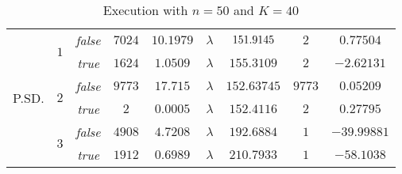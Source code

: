 \documentclass[notitlepage]{article}
\newcommand{\highlight}[1]{{\cellcolor{yellow!30} #1}}
\begin{document}
\begin{table}[H]
{\begin{tabular}{| c | c | c | c | c | c | c | c | c |}
    \multirow{6}{*}{P.SD.} & \multirow{2}{*}{$1$} & {\itshape false} & $7024$ & $10.1979$ & $\lambda$ & $\highlight{151.9145}$ & $2$ & $0.77504$ \\
    \cline{3-9}
     & & {\itshape true} & $1624$ & $1.0509$ & $\lambda$ & $155.3109$ & $2$ & $-2.62131$ \\
    \cline{2-9}
    & \multirow{2}{*}{$2$} & {\itshape false} & $9773$ & $17.715$ & $\lambda$ & $152.63745$ & $9773$ & $0.05209$ \\ 
    \cline{3-9}
     & & {\itshape true} & $2$ & $0.0005$ & $\lambda$ & $152.4116$ & $2$ & $0.27795$ \\ 
    \cline{2-9}   
     & \multirow{2}{*}{$3$} & {\itshape false} & $4908$ & $4.7208$ & $\lambda$ & $192.6884$ & $1$ & $-39.99881$ \\
    \cline{3-9}
     & & {\itshape true} & $1912$ & $0.6989$ & $\lambda$ & $210.7933$ & $1$ & $-58.1038$ \\
    \hline
  \end{tabular}%
  }
  \caption{Execution with $n=50$ and $K=40$}
  \label{tab:n-50-K-40}
\end{table}

\vspace{1em}
\end{document}
